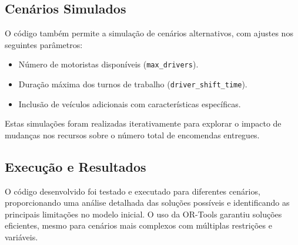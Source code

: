 \subsection{Cenários Simulados}\label{subsec:cenarios-simulados}
O código também permite a simulação de cenários alternativos, com ajustes nos seguintes parâmetros:
\begin{itemize}
    \item Número de motoristas disponíveis (\texttt{max\_drivers}).
    \item Duração máxima dos turnos de trabalho (\texttt{driver\_shift\_time}).
    \item Inclusão de veículos adicionais com características específicas.
\end{itemize}
Estas simulações foram realizadas iterativamente para explorar o impacto de mudanças nos recursos sobre o número total de encomendas entregues.

\subsection{Execução e Resultados}\label{subsec:execucao-e-resultados}
O código desenvolvido foi testado e executado para diferentes cenários, proporcionando uma análise detalhada das soluções possíveis e identificando as principais limitações no modelo inicial.
O uso da OR-Tools garantiu soluções eficientes, mesmo para cenários mais complexos com múltiplas restrições e variáveis.